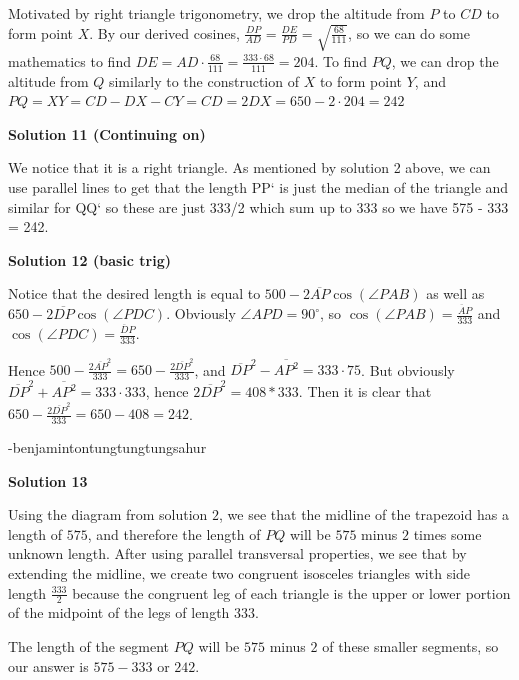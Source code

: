 \begin{enumerate}
 Motivated by right triangle trigonometry, we drop the altitude from $P$ to $CD$ to form point $X$. By our derived cosines, $\frac{DP}{AD} = \frac{DE}{PD} = \sqrt{\frac{68}{111}}$, so we can do some mathematics to find $DE = AD \cdot \frac{68}{111} = \frac{333 \cdot 68}{111} = 204$. To find $PQ$, we can drop the altitude from $Q$ similarly to the construction of $X$ to form point $Y$, and $PQ = XY = CD - DX - CY = CD = 2DX = 650-2\cdot204 = \boxed{242}$




\textbf{Solution 11 (Continuing on)}

We notice that it is a right triangle. As mentioned by solution 2 above, we can use parallel lines to get that the length PP` is just the median of the triangle and similar for QQ` so these are just 333/2 which sum up to 333 so we have 575 - 333 = 242.

 



\textbf{Solution 12 (basic trig)}

Notice that the desired length is equal to $500-2\overline{AP}\cos (\angle PAB)$ as well as $650-2\overline{DP}\cos (\angle PDC)$. Obviously $\angle APD = 90^\circ$, so $\cos(\angle PAB)=\frac{\overline AP}{333}$ and $\cos(\angle PDC)=\frac{\overline DP}{333}$.

 Hence $500-\frac{2\overline{AP}^2}{333}=650-\frac{2\overline{DP}^2}{333}$, and $\overline{DP}^2-\overline{AP^2}=333\cdot 75$. But obviously $\overline{DP}^2+\overline{AP^2}=333\cdot 333$, hence $2\overline{DP}^2=408*333$. Then it is clear that $650-\frac{2\overline{DP}^2}{333}=650-408=\boxed{242}$.

 -benjamintontungtungtungsahur

 



\textbf{Solution 13}

Using the diagram from solution $2$, we see that the midline of the trapezoid has a length of $575$, and therefore the length of $PQ$ will be $575$ minus $2$ times some unknown length. After using parallel transversal properties, we see that by extending the midline, we create two congruent isosceles triangles with side length $\frac{333}{2}$ because the congruent leg of each triangle is the upper or lower portion of the midpoint of the legs of length $333$.

 The length of the segment $PQ$ will be $575$ minus $2$ of these smaller segments, so our answer is $575-333$ or $\boxed{242}$.


\end{enumerate}
